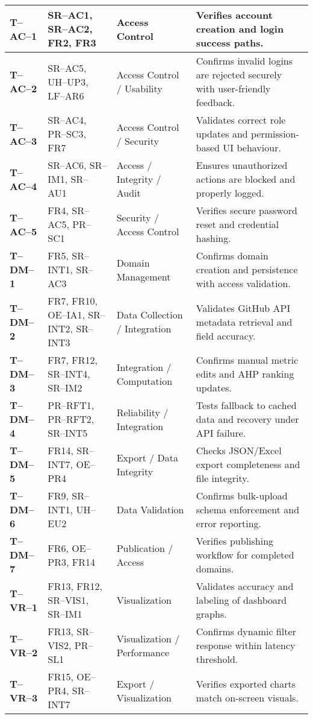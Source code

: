 \documentclass[12pt, titlepage]{article}
\begin{document}
\begin{longtable}{|p{}|p{}|p{}|p{}|}
\textbf{T--AC--1} & SR--AC1, SR--AC2, FR2, FR3 & Access Control & Verifies account creation and login success paths. \\
\hline
\textbf{T--AC--2} & SR--AC5, UH--UP3, LF--AR6 & Access Control / Usability & Confirms invalid logins are rejected securely with user-friendly feedback. \\
\hline
\textbf{T--AC--3} & SR--AC4, PR--SC3, FR7 & Access Control / Security & Validates correct role updates and permission-based UI behaviour. \\
\hline
\textbf{T--AC--4} & SR--AC6, SR--IM1, SR--AU1 & Access / Integrity / Audit & Ensures unauthorized actions are blocked and properly logged. \\
\hline
\textbf{T--AC--5} & FR4, SR--AC5, PR--SC1 & Security / Access Control & Verifies secure password reset and credential hashing. \\
\hline
\textbf{T--DM--1} & FR5, SR--INT1, SR--AC3 & Domain Management & Confirms domain creation and persistence with access validation. \\
\hline
\textbf{T--DM--2} & FR7, FR10, OE--IA1, SR--INT2, SR--INT3 & Data Collection / Integration & Validates GitHub API metadata retrieval and field accuracy. \\
\hline
\textbf{T--DM--3} & FR7, FR12, SR--INT4, SR--IM2 & Integration / Computation & Confirms manual metric edits and AHP ranking updates. \\
\hline
\textbf{T--DM--4} & PR--RFT1, PR--RFT2, SR--INT5 & Reliability / Integration & Tests fallback to cached data and recovery under API failure. \\
\hline
\textbf{T--DM--5} & FR14, SR--INT7, OE--PR4 & Export / Data Integrity & Checks JSON/Excel export completeness and file integrity. \\
\hline
\textbf{T--DM--6} & FR9, SR--INT1, UH--EU2 & Data Validation & Confirms bulk-upload schema enforcement and error reporting. \\
\hline
\textbf{T--DM--7} & FR6, OE--PR3, FR14 & Publication / Access & Verifies publishing workflow for completed domains. \\
\hline
\textbf{T--VR--1} & FR13, FR12, SR--VIS1, SR--IM1 & Visualization & Validates accuracy and labeling of dashboard graphs. \\
\hline
\textbf{T--VR--2} & FR13, SR--VIS2, PR--SL1 & Visualization / Performance & Confirms dynamic filter response within latency threshold. \\
\hline
\textbf{T--VR--3} & FR15, OE--PR4, SR--INT7 & Export / Visualization & Verifies exported charts match on-screen visuals. \\

\end{longtable}
\end{document}
